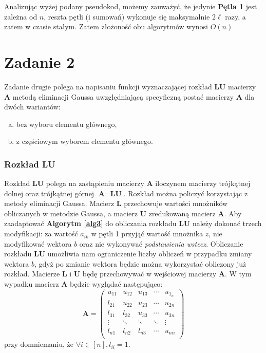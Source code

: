 \documentclass[12pt]{article}
\begin{document}
Analizując wyżej podany pseudokod, możemy zauważyć, że jedynie \textbf{Pętla 1} jest zależna od $n$, reszta pętli (i sumowań) wykonuje się maksymalnie $2 \ell$ razy, a zatem w czasie stałym. Zatem złożoność obu algorytmów wynosi $O(n)$ 

\section{Zadanie 2}
Zadanie drugie polega na napisaniu funkcji wyznaczającej rozkład \textbf{LU} macierzy \textbf{A} metodą eliminacji Gaussa uwzględniającą specyficzną postać macierzy \textbf{A} dla dwóch wariantów:
\begin{enumerate}[(a)]
	\item bez wyboru elementu głównego,
	\item z częściowym wyborem elementu głównego.
\end{enumerate}


\subsubsection*{Rozkład LU}
Rozkład \textbf{LU} polega na zastąpieniu macierzy \textbf{A} iloczynem macierzy trójkątnej dolnej oraz trójkątnej górnej $\textbf{A} = \textbf{L}\textbf{U}$. Rozkład można policzyć korzystając z metody eliminacji Gaussa. Macierz \textbf{L} przechowuje wartości mnożników obliczanych w metodzie Gaussa, a macierz \textbf{U} zredukowaną macierz \textbf{A}. Aby zaadaptować \textbf{Algorytm \ref{alg3}} do obliczania rozkładu \textbf{LU} należy dokonać trzech modyfikacji: za wartość $a_{ik}$ w pętli 1 przyjąć wartość mnożnika $z$, nie modyfikować wektora $b$ oraz nie wykonywać \textit{podstawienia wstecz}. Obliczanie rozkładu \textbf{LU} umożliwia nam ograniczenie liczby obliczeń w przypadku zmiany wektora $b$, gdyż po zmianie wektora będzie można wykorzystać obliczony już rozkład. Macierze \textbf{L} i \textbf{U} będę przechowywać w wejściowej macierzy \textbf{A}. W tym wypadku macierz \textbf{A} będzie wyglądać następująco:
\begin{equation}
\textbf{A} = 
\begin{pmatrix}
u_{1 1} & u_{1 2} & u_{1 3} & \cdots & u_{1_n}\\
l_{2 1} & u_{2 2} & u_{2 3} & \cdots & u_{2 n}\\
l_{3 1} & l_{3 2} & u_{3 3} & \cdots & u_{3 n}\\
\vdots & \ddots & \ddots & \ddots & \vdots \\
l_{n 1} & l_{n 2} & l_{n 3} & \cdots & u_{n n}\\
\end{pmatrix}
\end{equation}
przy domniemaniu, że $\forall i \in [n], l_{ii}=1$.
\end{document}
